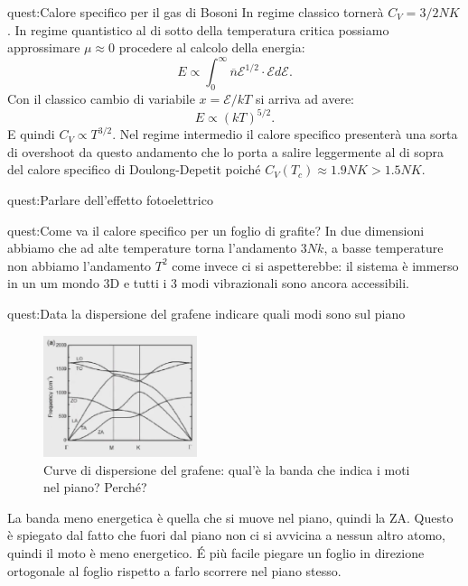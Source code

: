 \begin{quest}{quest:Calore specifico per il gas di Bosoni}
    In regime classico tornerà $C_V = 3 /2 NK$. In regime quantistico al di sotto della temperatura critica possiamo approssimare $\mu\approx  0$ procedere al calcolo della energia:
\[
    E \propto  \int_0^{\infty} \overline{n}\mathcal{E}^{1 /2}\cdot \mathcal{E}  d\mathcal{E}
.\] 
Con il classico cambio di variabile $x = \mathcal{E}  /kT$ si arriva ad avere:
\[
    E \propto  \left(kT\right)^{5 /2}
.\] 
E quindi $C_V \propto T^{3 /2}$. Nel regime intermedio il calore specifico presenterà una sorta di overshoot da questo andamento che lo porta a salire leggermente al di sopra del calore specifico di Doulong-Depetit poiché $C_V(T_c) \approx 1.9 NK > 1.5 NK$.
\end{quest}
\begin{quest}{quest:Parlare dell'effetto fotoelettrico}
\end{quest}
\begin{quest}{quest:Come va il calore specifico per un foglio di grafite?}
In due dimensioni abbiamo che ad alte temperature torna l'andamento $3Nk$, a basse temperature non abbiamo l'andamento $T^2$ come invece ci si aspetterebbe: il sistema è immerso in un um mondo 3D e tutti i 3 modi vibrazionali sono ancora accessibili.
\end{quest}
\begin{quest}{quest:Data la dispersione del grafene indicare quali modi sono sul piano}
    \begin{figure}[H]
        \centering
	\includegraphics[width=0.4\textwidth]{figures/dipersione_grafene.png}
        \caption{Curve di dispersione del grafene: qual'è la banda che indica i moti nel piano? Perché?}
        \label{fig:figures-dipersione_grafene-png}
    \end{figure}
    La banda meno energetica è quella che si muove nel piano, quindi la ZA. Questo è spiegato dal fatto che fuori dal piano non ci si avvicina a nessun altro atomo, quindi il moto è meno energetico. É più facile piegare un foglio in direzione ortogonale al foglio rispetto a farlo scorrere nel piano stesso.
\end{quest}
